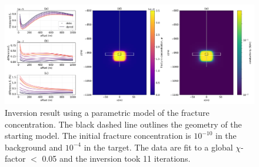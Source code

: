 \begin{figure}
    \begin{center}
    \includegraphics[width=\textwidth]{figures/inversion/dc_parametric_inversion_phi_correctz0_dz.png}
    \end{center}
\caption{
    Inversion result using a parametric model of the fracture concentration.
    The black dashed line outlines the geometry of the starting model. The initial fracture concentration
    is $10^{-10}$ in the background and $10^{-4}$ in the target.
    The data are fit to a global $\chi$-factor $<$ 0.05 and the inversion took 11 iterations.
}
\label{fig:dc_parametric_inversion_phi_correctz0_dz}
\end{figure}
